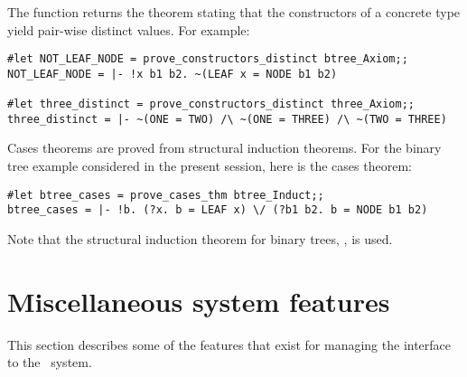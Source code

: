 The function  returns the theorem stating
that the constructors of a concrete type yield pair-wise distinct values.  For
example:

\begin{session}\begin{verbatim}
#let NOT_LEAF_NODE = prove_constructors_distinct btree_Axiom;;
NOT_LEAF_NODE = |- !x b1 b2. ~(LEAF x = NODE b1 b2)

#let three_distinct = prove_constructors_distinct three_Axiom;;
three_distinct = |- ~(ONE = TWO) /\ ~(ONE = THREE) /\ ~(TWO = THREE)
\end{verbatim}\end{session}

Cases theorems are proved from structural induction theorems. For the binary
tree example considered in the present session, here is the cases theorem:

\begin{session}\begin{verbatim}
#let btree_cases = prove_cases_thm btree_Induct;;
btree_cases = |- !b. (?x. b = LEAF x) \/ (?b1 b2. b = NODE b1 b2)
\end{verbatim}\end{session}

\noindent Note that the structural induction theorem for binary trees,
, is used.

\section{Miscellaneous system features}
\label{avramisc}

This section describes some of the features
that exist for managing the interface to the
\HOL\ system.

